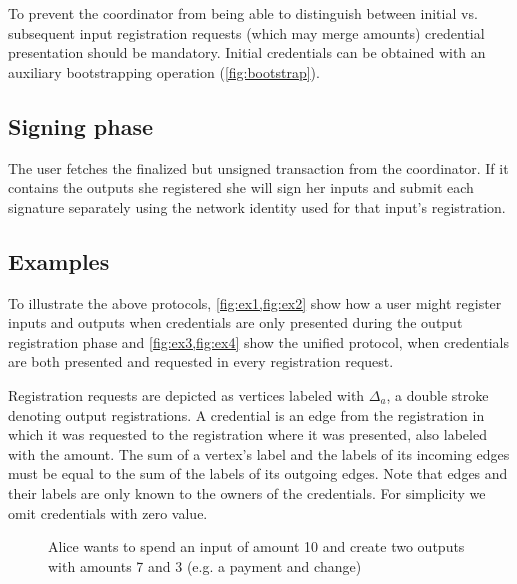 \documentclass{article}
\begin{document}
To prevent the coordinator from being able to distinguish between initial vs. subsequent input registration requests (which may merge amounts) credential presentation should be mandatory. Initial credentials can be obtained with an auxiliary bootstrapping operation (\cref{fig:bootstrap}).

\subsection{Signing phase}

The user fetches the finalized but unsigned transaction from the coordinator. If it contains the outputs she registered she will sign her inputs and submit each signature separately using the network identity used for that input's registration.

\subsection{Examples}

To illustrate the above protocols, \cref{fig:ex1,fig:ex2} show how a user might register inputs and outputs when credentials are only presented during the output registration phase and \cref{fig:ex3,fig:ex4} show the unified protocol, when credentials are both presented and requested in every registration request.

Registration requests are depicted as vertices labeled with $\Delta_a$, a double stroke denoting output registrations. A credential is an edge from the registration in which it was requested to the registration where it was presented, also labeled with the amount. The sum of a vertex's label and the labels of its incoming edges must be equal to the sum of the labels of its outgoing edges. Note that edges and their labels are only known to the owners of the credentials. For simplicity we omit credentials with zero value.

\begin{figure}[h!]
  \centering
  \caption{Alice wants to spend an input of amount 10 and create two outputs with amounts 7 and 3 (e.g. a payment and change)}
  \label{fig:ex1}
\end{figure}
\end{document}
